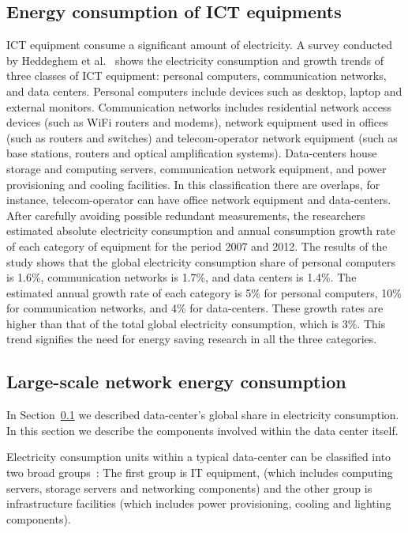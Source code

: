 \subsection{Energy consumption of ICT equipments}
\label{section:ictequipment}
ICT equipment consume a significant amount of electricity. A survey conducted by Heddeghem et al.~\cite{DBLP:journals/comcom/HeddeghemLLCPD14} shows the electricity consumption and growth trends of three classes of ICT equipment: personal computers, communication networks, and data centers. Personal computers include devices such as desktop, laptop and external monitors. Communication networks includes residential network access devices (such as WiFi routers and modems), network equipment used in offices (such as routers and switches) and telecom-operator network equipment (such as base stations, routers and optical amplification systems). Data-centers house storage and computing servers, communication network equipment, and power provisioning and cooling facilities.  In this classification there are overlaps, for instance, telecom-operator can have office network equipment and data-centers. After carefully avoiding possible redundant measurements, the researchers estimated absolute electricity consumption and annual consumption growth rate of each category of equipment for the period 2007 and 2012. The results of the study shows that the global electricity consumption share of personal computers is 1.6\%, communication networks is 1.7\%, and data centers is 1.4\%. The estimated annual growth rate of each category is 5\% for personal computers, 10\% for communication networks, and 4\% for data-centers. These growth rates are higher than that of the total global electricity consumption, which is 3\%. This trend signifies the need for energy saving research in all the three categories.
\subsection {Large-scale network energy consumption}
\label{section:datacenter} 
In Section~\ref{section:ictequipment} we described data-center's global share in electricity consumption. In this section we describe the components involved within the data center itself.

Electricity consumption units within a typical data-center can be classified into two broad groups~\cite{DBLP:journals/comsur/DayarathnaWF16}: The first group is IT equipment, (which includes computing servers, storage servers and networking components) and the other group is infrastructure facilities (which includes power provisioning, cooling and lighting components).

